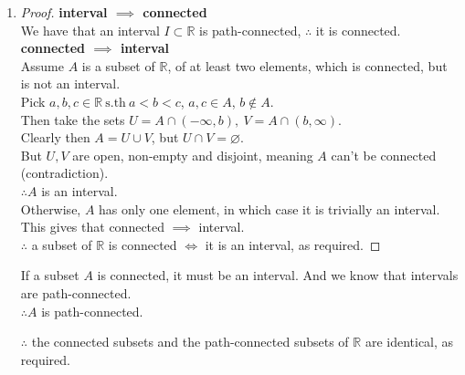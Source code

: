 \documentclass{article}
\newcommand{\sth}{\mathrm{s.th}\ }
\newcommand{\R}{\mathbb{R}}
\renewcommand{\emptyset}{\varnothing}
\theoremstyle{remark}
\begin{document}
\begin{enumerate}
      \item \begin{proof}
                  \textbf{interval $\mathbf{\implies}$ connected}\\
                  We have that an interval $I\subset \R$ is path-connected, $\therefore$ it is connected.\\
                  \textbf{connected $\mathbf{\implies}$ interval}\\
                  Assume $A$ is a subset of $\R$, of at least two elements, which is connected, but is not an interval.\\
                  Pick $a,b,c \in \R\ \sth a < b < c$, $a,c \in A$, $b \notin A$.\\
                  Then take the sets $ U=A \cap (-\infty,b),\ V=A \cap (b, \infty) $.\\
                  Clearly then $A = U \cup V$, but $U \cap V = \emptyset$.\\
                  But $U,V$ are open, non-empty and disjoint, meaning $A$ can't be connected (contradiction).\\
                  $\therefore A$ is an interval.\\
                  Otherwise, $A$ has only one element, in which case it is trivially an interval.\\
                  This gives that connected $\implies$ interval.\\
                  $\therefore$ a subset of $\R$ is connected $\iff$ it is an interval, as required.
            \end{proof}

            If a subset $A$ is connected, it must be an interval. And we know that intervals are path-connected.\\
            $\therefore A$ is path-connected.

            $\therefore$ the connected subsets and the path-connected subsets of $\R$ are identical, as required.


\end{enumerate}
\end{document}
